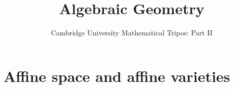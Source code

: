 \documentclass{article}
\title{Algebraic Geometry}
\author{Cambridge University Mathematical Tripos: Part II}
\begin{document}
\maketitle

\tableofcontentsnewpage{}


\section{Affine space and affine varieties}

\end{document}
